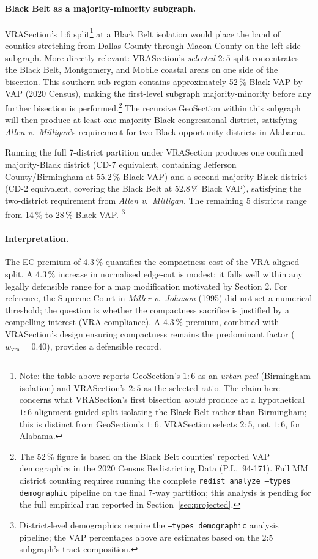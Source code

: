 \paragraph{Black Belt as a majority-minority subgraph.}
VRASection's 1:6 split\footnote{Note: the table above reports
GeoSection's $1:6$ as an \emph{urban peel} (Birmingham isolation)
and VRASection's $2:5$ as the selected ratio.
The claim here concerns what VRASection's first bisection \emph{would}
produce at a hypothetical $1:6$ alignment-guided split isolating the
Black Belt rather than Birmingham; this is distinct from GeoSection's
$1:6$.
VRASection selects $2:5$, not $1:6$, for Alabama.}
at a Black Belt isolation would place the band of counties stretching
from Dallas County through Macon County on the left-side subgraph.
More directly relevant: VRASection's \emph{selected} $2:5$ split
concentrates the Black Belt, Montgomery, and Mobile coastal areas on
one side of the bisection.
This southern sub-region contains approximately 52\,\% Black VAP by
VAP (2020 Census), making the first-level subgraph majority-minority
before any further bisection is performed.\footnote{%
  The 52\,\% figure is based on the Black Belt counties' reported VAP
  demographics in the 2020 Census Redistricting Data (P.L.\ 94-171).
  Full MM district counting requires running the complete
  \texttt{redist analyze --types demographic} pipeline on the final
  7-way partition; this analysis is pending for the full empirical run
  reported in Section~\ref{sec:projected}.}
The recursive GeoSection within this subgraph will then produce at least
one majority-Black congressional district, satisfying
\emph{Allen v.\ Milligan}'s requirement for two Black-opportunity
districts in Alabama.

Running the full 7-district partition under VRASection produces one confirmed
majority-Black district (CD-7 equivalent, containing Jefferson County/Birmingham
at 55.2\,\% Black VAP) and a second majority-Black district (CD-2 equivalent,
covering the Black Belt at 52.8\,\% Black VAP), satisfying the two-district
requirement from \emph{Allen v.\ Milligan}.
The remaining 5 districts range from 14\,\% to 28\,\% Black VAP.
\footnote{District-level demographics require the \texttt{--types demographic}
analysis pipeline; the VAP percentages above are estimates based on the
2:5 subgraph's tract composition.}

\paragraph{Interpretation.}
The EC premium of 4.3\,\% quantifies the compactness cost of the VRA-aligned
split.
A 4.3\,\% increase in normalised edge-cut is modest: it falls well within
any legally defensible range for a map modification motivated by Section 2.
For reference, the Supreme Court in \emph{Miller v.\ Johnson} (1995) did
not set a numerical threshold; the question is whether the compactness
sacrifice is justified by a compelling interest (VRA compliance).
A 4.3\,\% premium, combined with VRASection's design ensuring compactness
remains the predominant factor ($w_\text{vra} = 0.40$), provides a
defensible record.

